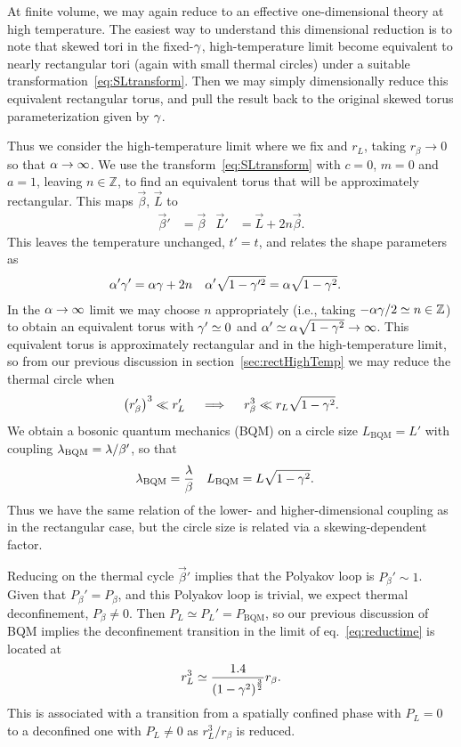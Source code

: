 At finite volume, we may again reduce to an effective one-dimensional theory at high temperature.
The easiest way to understand this dimensional reduction is to note that skewed tori in the fixed-$\gamma$, high-temperature limit become equivalent to nearly rectangular tori (again with small thermal circles) under a suitable transformation~\eqref{eq:SLtransform}.
Then we may simply dimensionally reduce this equivalent rectangular torus, and pull the result back to the original skewed torus parameterization given by $\gamma$.

Thus we consider the high-temperature limit where we fix \ga and $r_L$, taking $r_{\beta} \to 0$ so that $\alpha \to \infty$.
We use the transform~\eqref{eq:SLtransform} with $c = 0$, $m = 0$ and $a = 1$, leaving $n \in \mathbb{Z}$, to find an equivalent torus that will be approximately rectangular.
This maps $\vec{\beta}$, $\vec{L}$ to
\begin{align}
  \vec{\beta}' & = \vec{\beta} &
  \vec{L}' & = \vec{L} + 2n \vec{\beta}.
\end{align}
This leaves the temperature unchanged, $t' = t$, and relates the shape parameters as
\begin{align}
  \alpha' \gamma' & = \alpha \gamma + 2n &
  \alpha' \sqrt{1 - \gamma'^2} & = \alpha \sqrt{1 - \gamma^2}.
\end{align}
In the $\alpha \to \infty$ limit we may choose $n$ appropriately (i.e., taking $-\alpha \gamma / 2 \simeq n \in \mathbb{Z}$) to obtain an equivalent torus with $\gamma' \simeq 0$ and $\alpha' \simeq \alpha \sqrt{1 - \gamma^2} \to \infty$.
This equivalent torus is approximately rectangular and in the high-temperature limit, so from our previous discussion in section~\ref{sec:rectHighTemp} we may reduce the thermal circle when
\begin{equation}
  \label{eq:reductime}
  \left(r_{\beta}' \right)^3 \ll r_L' \quad \implies \quad r_{\beta}^3 \ll r_L \sqrt{1 - \gamma^2}.
\end{equation}
We obtain a bosonic quantum mechanics (BQM) on a circle size $L_{\text{BQM}} = L'$ with coupling $\lambda_{\text{BQM}} = \lambda / \beta'$, so that
\begin{align}
  \lambda_{\text{BQM}} & = \frac{\lambda}{\beta} &
  L_{\text{BQM}} & = L \sqrt{1 - \gamma^2}.
\end{align}
Thus we have the same relation of the lower- and higher-dimensional coupling as in the rectangular case, but the circle size is related via a skewing-dependent factor.

Reducing on the thermal cycle $\vec{\beta}'$ implies that the Polyakov loop is $P_{\beta}' \sim 1$.
Given that $P_{\beta}' = P_{\beta}$, and this Polyakov loop is trivial, we expect thermal deconfinement, $P_{\beta} \ne 0$.
Then $P_L \simeq P_L' = P_{\text{BQM}}$, so our previous discussion of BQM implies the deconfinement transition in the limit of eq.~\eqref{eq:reductime} is located at
\begin{equation}
  \label{eq:skewBQM}
  r_L^3 \simeq \frac{1.4}{\left(1 - \gamma^2\right)^{\frac{3}{2}}} r_{\beta}.
\end{equation}
This is associated with a transition from a spatially confined phase with $P_L = 0$ to a deconfined one with $P_L \ne 0$ as $r_L^3 / r_{\beta}$ is reduced.

